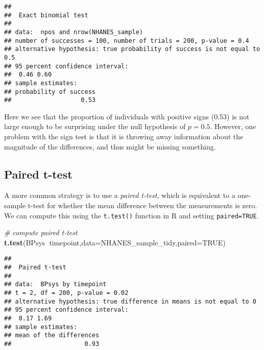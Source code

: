 \documentclass[]{book}
\newenvironment{Shaded}{\begin{snugshade}}{\end{snugshade}}
\newcommand{\KeywordTok}[1]{\textcolor[rgb]{0.13,0.29,0.53}{\textbf{#1}}}
\newcommand{\DataTypeTok}[1]{\textcolor[rgb]{0.13,0.29,0.53}{#1}}
\newcommand{\StringTok}[1]{\textcolor[rgb]{0.31,0.60,0.02}{#1}}
\newcommand{\CommentTok}[1]{\textcolor[rgb]{0.56,0.35,0.01}{\textit{#1}}}
\newcommand{\OtherTok}[1]{\textcolor[rgb]{0.56,0.35,0.01}{#1}}
\newcommand{\OperatorTok}[1]{\textcolor[rgb]{0.81,0.36,0.00}{\textbf{#1}}}
\newcommand{\NormalTok}[1]{#1}
\theoremstyle{definition}
\theoremstyle{definition}
\theoremstyle{definition}
\theoremstyle{remark}
\begin{document}
\begin{Shaded}
\end{Shaded}

\begin{verbatim}
## 
##  Exact binomial test
## 
## data:  npos and nrow(NHANES_sample)
## number of successes = 100, number of trials = 200, p-value = 0.4
## alternative hypothesis: true probability of success is not equal to 0.5
## 95 percent confidence interval:
##  0.46 0.60
## sample estimates:
## probability of success 
##                   0.53
\end{verbatim}

Here we see that the proportion of individuals with positive signs
(0.53) is not large enough to be surprising under the null hypothesis of
\(p=0.5\). However, one problem with the sign test is that it is
throwing away information about the magnitude of the differences, and
thus might be missing something.

\subsection{Paired t-test}\label{paired-t-test}

A more common strategy is to use a \emph{paired t-test}, which is
equivalent to a one-sample t-test for whether the mean difference
between the measurements is zero. We can compute this using the
\texttt{t.test()} function in R and setting \texttt{paired=TRUE}.

\begin{Shaded}
\begin{Highlighting}[]
\CommentTok{# compute paired t-test}
\KeywordTok{t.test}\NormalTok{(BPsys}\OperatorTok{~}\NormalTok{timepoint,}\DataTypeTok{data=}\NormalTok{NHANES_sample_tidy,}\DataTypeTok{paired=}\OtherTok{TRUE}\NormalTok{)}
\end{Highlighting}
\end{Shaded}

\begin{verbatim}
## 
##  Paired t-test
## 
## data:  BPsys by timepoint
## t = 2, df = 200, p-value = 0.02
## alternative hypothesis: true difference in means is not equal to 0
## 95 percent confidence interval:
##  0.17 1.69
## sample estimates:
## mean of the differences 
##                    0.93
\end{verbatim}
\end{document}
